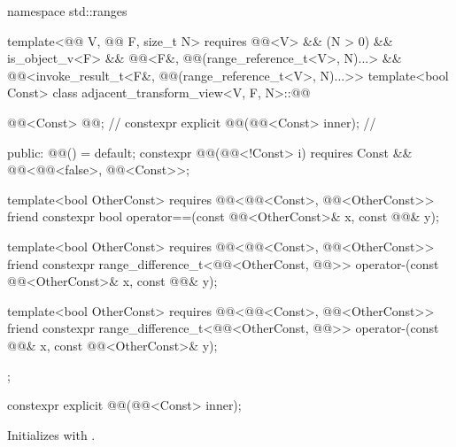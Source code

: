 %
\begin{codeblock}
namespace std::ranges {
  template<@@ V, @@ F, size_t N>
    requires @@<V> && (N > 0) && is_object_v<F> &&
             @@<F&, @@(range_reference_t<V>, N)...> &&
             @@<invoke_result_t<F&, @@(range_reference_t<V>, N)...>>
  template<bool Const>
  class adjacent_transform_view<V, F, N>::@@ {
    @@<Const> @@;                               // \expos
    constexpr explicit @@(@@<Const> inner);   // \expos

  public:
    @@() = default;
    constexpr @@(@@<!Const> i)
      requires Const && @@<@@<false>, @@<Const>>;

    template<bool OtherConst>
      requires @@<@@<Const>, @@<OtherConst>>
    friend constexpr bool operator==(const @@<OtherConst>& x, const @@& y);

    template<bool OtherConst>
      requires @@<@@<Const>, @@<OtherConst>>
    friend constexpr range_difference_t<@@<OtherConst, @@>>
      operator-(const @@<OtherConst>& x, const @@& y);

    template<bool OtherConst>
      requires @@<@@<Const>, @@<OtherConst>>
    friend constexpr range_difference_t<@@<OtherConst, @@>>
      operator-(const @@& x, const @@<OtherConst>& y);
  };
}
\end{codeblock}

%
\begin{itemdecl}
constexpr explicit @@(@@<Const> inner);
\end{itemdecl}

\begin{itemdescr}
\pnum
\effects
Initializes  with .
\end{itemdescr}

